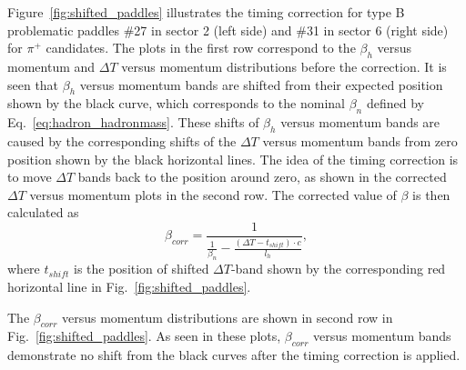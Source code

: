 Figure~\ref{fig:shifted_paddles} illustrates the timing correction for type B problematic paddles \#27 in sector 2 (left side) and \#31 in sector 6 (right side) for $\pi^+$ candidates. The plots in the first row correspond to the $\beta_{h}$ versus momentum and $\Delta T$ versus momentum distributions before the correction. It is seen that $\beta_{h}$ versus momentum bands are shifted from their expected position shown by the black curve, which corresponds to the nominal $\beta_{n}$ defined by Eq.~\eqref{eq:hadron_hadronmass}. These shifts of $\beta_{h}$ versus momentum bands are caused by the corresponding shifts of the $\Delta T$ versus momentum bands from zero position shown by the black horizontal lines. The idea of the timing correction is to move $\Delta T$ bands back to the position around zero, as shown in the corrected $\Delta T$ versus momentum plots in the second row. The corrected value of $\beta$ is then calculated as
\begin{equation}
\beta_{corr} = \frac{1}{\frac{1}{\beta_{n}} - \frac{(\Delta T-t_{shift})\cdot c}{l_{h}}},
\label{eq:beta_corr}
\end{equation}
where $t_{shift}$ is the position of shifted $\Delta T$-band shown by the corresponding red horizontal line in Fig.~\ref{fig:shifted_paddles}.

The $\beta_{corr}$ versus momentum distributions are shown in second row in Fig.~\ref{fig:shifted_paddles}. As seen in these plots, $\beta_{corr}$ versus momentum bands demonstrate no shift from the black curves after the timing correction is applied.


